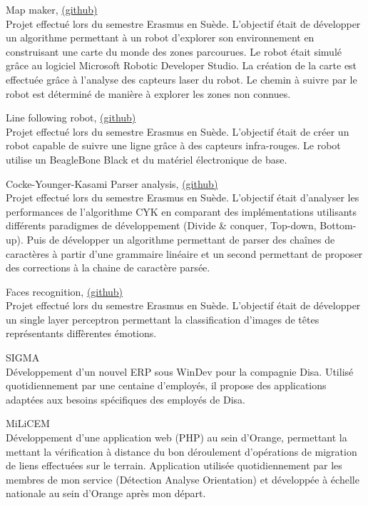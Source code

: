 {\large Map maker, \href{https://github.com/ThomasRanvier/map_maker}{(github)}}
\\
{\small Projet effectu\'e lors du semestre Erasmus en Su\`ede. 
L'objectif \'etait de d\'evelopper un algorithme permettant \`a un robot d'explorer son environnement en construisant une carte du monde des zones parcourues.
Le robot \'etait simul\'e gr\^ace au logiciel Microsoft Robotic Developer Studio.
La cr\'eation de la carte est effectu\'ee gr\^ace \`a l'analyse des capteurs laser du robot.
Le chemin \`a suivre par le robot est d\'etermin\'e de mani\`ere \`a explorer les zones non connues.}

\medskip
    
{\large Line following robot, \href{https://github.com/ThomasRanvier/line_following_robot}{(github)}}
\\
{\small Projet effectu\'e lors du semestre Erasmus en Su\`ede. 
L'objectif \'etait de cr\'eer un robot capable de suivre une ligne gr\^ace \`a des capteurs infra-rouges.
Le robot utilise un BeagleBone Black et du mat\'eriel \'electronique de base.}

\medskip

{\large Cocke-Younger-Kasami Parser analysis, \href{https://github.com/ThomasRanvier/cyk_algorithm_analysis}{(github)}}
\\
{\small Projet effectu\'e lors du semestre Erasmus en Su\`ede. 
L'objectif \'etait d'analyser les performances de l'algorithme CYK en comparant des impl\'ementations utilisants diff\'erents paradigmes de d\'eveloppement (Divide \& conquer, Top-down, Bottom-up).
Puis de d\'evelopper un algorithme permettant de parser des cha\^ines de caract\`eres \`a partir d'une grammaire lin\'eaire et un second permettant de proposer des corrections \`a la chaine de caract\`ere pars\'ee.}

\medskip

{\large Faces recognition, \href{https://github.com/ThomasRanvier/faces_recognition_nn}{(github)}}
\\
{\small Projet effectu\'e lors du semestre Erasmus en Su\`ede.
L'objectif \'etait de d\'evelopper un single layer perceptron permettant la classification d'images de t\^etes représentants diff\`erentes \'emotions.}

\medskip

{\large SIGMA}
\\
{\small D\'eveloppement d'un nouvel ERP sous WinDev pour la compagnie Disa.
Utilis\'e quotidiennement par une centaine d'employ\'es, il propose des applications adapt\'ees aux besoins sp\'ecifiques des employ\'es de Disa.}

\medskip

{\large MiLiCEM}
\\
{\small D\'eveloppement d'une application web (PHP) au sein d'Orange, permettant la mettant la vérification à distance du bon d\'eroulement d'op\'erations de migration de liens effectu\'ees sur le terrain.
Application utilis\'ee quotidiennement par les membres de mon service (D\'etection Analyse Orientation) et d\'evelopp\'ee \`a \'echelle nationale au sein d'Orange apr\`es mon d\'epart.}

\medskip

